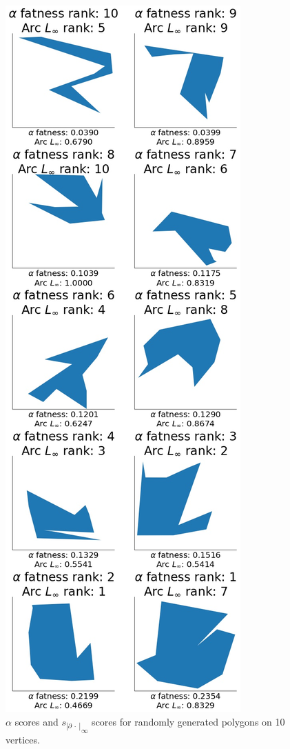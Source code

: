 \documentclass[]{jocg}
\newcommand{\abs}[1]{|#1|}
\newcommand{\chordarc}{s_{\abs{\partial~\cdot~}}}
\theoremstyle{definition}
\theoremstyle{remark}
\begin{document}
\begin{figure}[t]
  \centering
  \includegraphics[height=0.8\textheight]{../plots/u_10_alpha_score_chord_arc_infinity_vertices_0-05_delta_ranking.jpg}
  \caption{$\alpha$ scores and ${\chordarc}_{\infty}$ scores for randomly
  generated polygons on 10 vertices.}
  \label{fig:alph-inft-10}
\end{figure}
\end{document}
